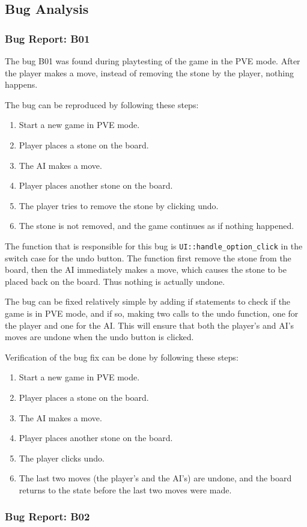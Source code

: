 \subsection {Bug Analysis}

\subsubsection*{Bug Report: B01}

The bug B01 was found during playtesting of the game in the PVE mode. After the player makes a move, instead of removing the stone by the player, nothing happens.

The bug can be reproduced by following these steps:
\begin{enumerate}
    \item Start a new game in PVE mode.
    \item Player places a stone on the board.
    \item The AI makes a move.
    \item Player places another stone on the board.
    \item The player tries to remove the stone by clicking undo.
    \item The stone is not removed, and the game continues as if nothing happened.
\end{enumerate}

The function that is responsible for this bug is \texttt{UI::handle\_option\_click} in the switch case for the undo button. The function first remove the stone from the board, then the AI immediately makes a move, which causes the stone to be placed back on the board. Thus nothing is actually undone. 

The bug can be fixed relatively simple by adding if statements to check if the game is in PVE mode, and if so, making two calls to the undo function, one for the player and one for the AI. This will ensure that both the player's and AI's moves are undone when the undo button is clicked.

Verification of the bug fix can be done by following these steps:
\begin{enumerate}
    \item Start a new game in PVE mode.
    \item Player places a stone on the board.
    \item The AI makes a move.
    \item Player places another stone on the board.
    \item The player clicks undo.
    \item The last two moves (the player's and the AI's) are undone, and the board returns to the state before the last two moves were made.
\end{enumerate}

\subsubsection*{Bug Report: B02}

